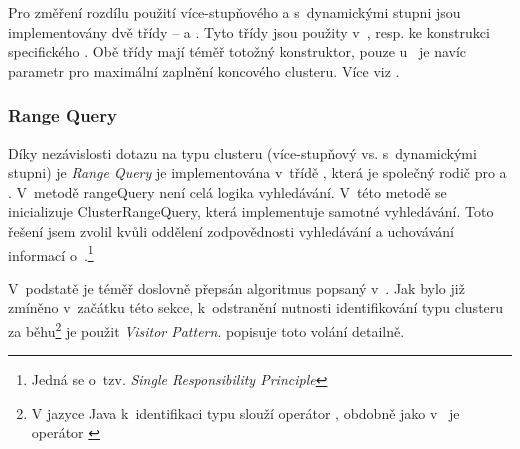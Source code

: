 Pro změření rozdílu použití více-stupňového  a  s~dynamickými stupni jsou implementovány dvě třídy -- \linebreak {} a \linebreak {}. Tyto třídy jsou použity v~, \linebreak resp.  ke konstrukci specifického .
Obě třídy mají téměř totožný konstruktor, pouze u~ je navíc parametr pro maximální zaplnění koncového clusteru. Více viz .

\subsubsection{Range Query}
Díky nezávislosti dotazu na typu clusteru (více-stupňový vs. s~dynamickými stupni) je \emph{Range Query} je implementována v~třídě , která je společný rodič pro  a . V~metodě rangeQuery není celá logika vyhledávání. V~této metodě se inicializuje ClusterRangeQuery, která implementuje samotné vyhledávání. Toto řešení jsem zvolil kvůli oddělení zodpovědnosti vyhledávání a uchovávání informací o~.\footnote{Jedná se o~tzv. \emph{Single Responsibility Principle}\cite{martin2003agile}}

V~podstatě je téměř doslovně přepsán algoritmus popsaný v~. Jak bylo již zmíněno v~začátku této sekce, k~odstranění nutnosti identifikování typu clusteru za běhu\footnote{V jazyce Java k~identifikaci typu slouží operátor \cite{gosling2013java}, obdobně jako v~\CC{} je operátor \cite{ISO:2012:CPP}} je použit \emph{Visitor Pattern}.  popisuje toto volání detailně.


%
%

